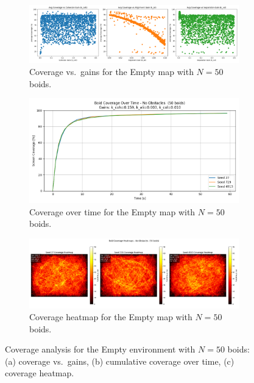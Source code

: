\documentclass[12pt]{article}
\begin{document}
\begin{figure}[h!]
  \centering
  \begin{subfigure}[b]{0.32\linewidth}
    \includegraphics[width=\linewidth]{cov_vs_gains/empty_50.png}
    \caption{Coverage vs.~gains for the Empty map with $N=50$ boids.}
    \label{fig:app:empty50_gains}
  \end{subfigure}\hfill
  \begin{subfigure}[b]{0.32\linewidth}
    \includegraphics[width=\linewidth]{optimal_cov_vs_time/empty_50.png}
    \caption{Coverage over time for the Empty map with $N=50$ boids.}
    \label{fig:app:empty50_time}
  \end{subfigure}\hfill
  \begin{subfigure}[b]{0.32\linewidth}
    \includegraphics[width=\linewidth]{heatmaps/empty_50.png}
    \caption{Coverage heatmap for the Empty map with $N=50$ boids.}
    \label{fig:app:empty50_heat}
  \end{subfigure}
  \caption{Coverage analysis for the Empty environment with $N=50$ boids: (a) coverage vs.~gains, (b) cumulative coverage over time, (c) coverage heatmap.}
  \label{fig:app:empty50}
\end{figure}
\end{document}
